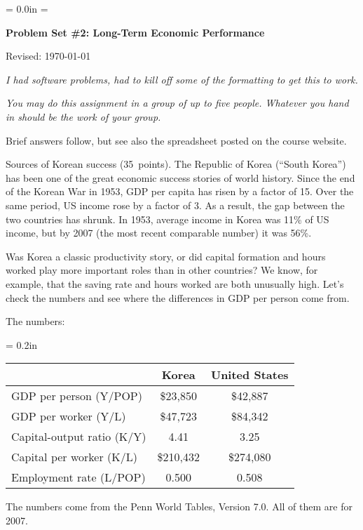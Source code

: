 \documentclass[12pt]{exam}
\begin{document}
\parindent = 0.0in
\parskip = \bigskipamount
\thispagestyle{empty}%

\centerline{\large \bf Problem Set \#2:  Long-Term Economic Performance}
\centerline{Revised:  \today}

\medskip
{\it I had software problems, had to kill off some of the formatting 
to get this to work. } 

\medskip
{\it You may do this assignment in a group of up to five people.
Whatever you hand in should be the work of your group.}

\begin{questions}

\begin{solution}
Brief answers follow,
but see also the spreadsheet posted on the course website.
\end{solution}

\question Sources of Korean success  (35~points).
The Republic of Korea (``South Korea'')
has been one of the great economic success stories of world history.
Since the end of the Korean War in 1953,
GDP per capita has risen by a factor of 15.
Over the same period, US income rose by a factor of 3.
As a result, the gap between the two countries has shrunk.
In 1953, average income in Korea was 11\% of US income,
but by 2007 (the most recent comparable number) it was 56\%.


Was Korea a classic productivity story,
or did capital formation and hours worked play more important
roles than in other countries?
We know, for example, that the saving rate and hours worked
are both unusually high.
Let's check the numbers and see where the differences
in GDP per person come from.

The numbers:
%
\begin{center}
\tabcolsep = 0.2in
\begin{tabular}{lcc}
\toprule
        &  Korea & United States \\
\midrule
GDP per person (Y/POP) &  \$23,850  & \$42,887 \\
GDP per worker (Y/L)    &  \$47,723  & \$84,342 \\
Capital-output ratio (K/Y)    &  4.41 &  3.25 \\
Capital per worker (K/L)      &  \$210,432  &  \$274,080 \\
Employment rate (L/POP)      & 0.500 &  0.508 \\
\bottomrule
\end{tabular}
\end{center}
%
The numbers come from the Penn World Tables, Version 7.0.
All of them are for 2007.
%
\begin{parts}


\end{parts}
\end{questions}
\end{document}
